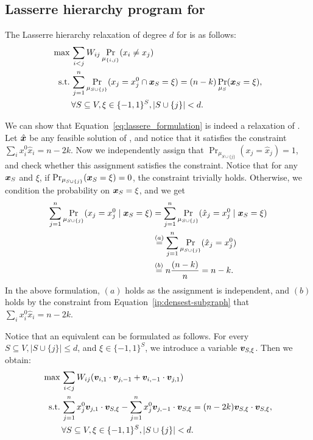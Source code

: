 \subsection{Lasserre hierarchy program for \maxcutkc}
\label{appendix:lasserre:program}
The Lasserre hierarchy relaxation of degree $d$ for \maxcutkc is as follows:
\begin{equation}\label{eq:lassere_formulation}
	\begin{aligned}
		\max\, & \sum_{ i < j } W_{ij} \Pr_{\mu_{\{i,j\}}} (x_i \neq x_j)  \\
		\textrm{s.t.} \, & \sum_{j=1}^n\Pr_{\mu_{S \cup \{j\}}} (x_j = x_j^0 \cap \bm{x}_{S} = \xi) = (n-k) \Pr_{\mu_{S}}(\bm{x}_{S} = \xi), \\
  & \forall S \subseteq V, \xi \in \{-1, 1\}^S, |S \cup \{j\}| < d.
	\end{aligned}
\end{equation}

We can show that Equation~\eqref{eq:lassere_formulation} is indeed a relaxation of \maxcutkc. 
Let $\hat{\bm{x}}$ be any feasible solution of \maxcutkc, and notice that it satisfies the constraint $\sum_{i} x_i^0 \hat{x}_i = n-2k$. 
Now we independently assign that $\Pr_{\mu_{S \cup \{j\}}}(x_j = \hat{x}_j) = 1$, and check whether this assignment satisfies the constraint. 
Notice that for any $\bm{x}_{S}$ and $\xi$, if $\Pr_{\mu_{S \cup \{j\}}}(\bm{x}_{S} = \xi) = 0$, the constraint trivially holds. 
Otherwise, we condition the probability on $\bm{x}_{S} = \xi$, and we get 
\begin{equation*}
\begin{aligned}
    \sum_{j=1}^n\Pr_{\mu_{S \cup \{j\}}} (x_j = x_j^0 \mid \bm{x}_{S} = \xi) 
    &= \sum_{j=1}^n\Pr_{\mu_{S \cup \{j\}} } (\hat{x}_j = x_j^0 \mid \bm{x}_{S} = \xi) \\
    &\stackrel{(a)}{=} \sum_{j=1}^n\Pr_{\mu_{S \cup \{j\}}} (\hat{x}_j = x_j^0) \\
    &\stackrel{(b)}{=} n \frac{(n-k)}{n} = n-k. \\
\end{aligned}
\end{equation*}
In the above formulation, $(a)$ holds as the assignment is independent, and $(b)$ holds by the constraint from Equation~\ref{ip:densest-subgraph} that $\sum_{i} x_i^0 \hat{x}_i = n-2k$.

Notice that an equivalent \sdp can be formulated as follows. For every $S \subseteq V, |S \cup \{j\}| \leq d$, and $\xi \in \{-1, 1\}^S$, we introduce a 
variable $\bm{v}_{S, \xi}$.
Then we obtain:
\begin{equation}\label{eq:lassere_formulation_matrix}
	\begin{aligned}
		\max\, & \sum_{ i < j } W_{ij} (\bm{v}_{i,1} \cdot \bm{v}_{j,-1} + \bm{v}_{i,-1} \cdot \bm{v}_{j,1})  \\
		\textrm{s.t.} \, &  \sum_{j=1}^n x_j^0 \bm{v}_{j,1} \cdot \bm{v}_{S,\xi} - \sum_{j=1}^n x_j^0 \bm{v}_{j,-1} \cdot \bm{v}_{S,\xi} = (n-2k) \bm{v}_{S,\xi} \cdot \bm{v}_{S,\xi}, \\
  & \forall S \subseteq V, \xi \in \{-1, 1\}^S, |S \cup \{j\}| < d.\\
	\end{aligned}
\end{equation}


